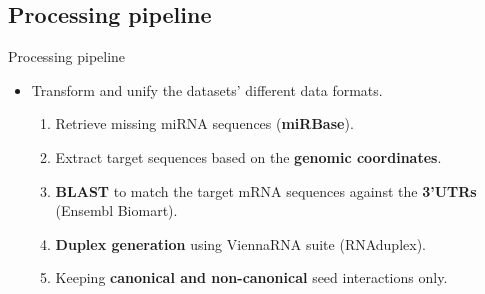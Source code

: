 \documentclass{beamer}
\begin{document}
\subsection{Processing pipeline}
\begin{frame}{Processing pipeline}
\begin{itemize}
\item Transform and unify the datasets' different data formats.
\begin{enumerate}
\item Retrieve missing miRNA sequences (\textbf{miRBase}).
\item Extract target sequences based on the \textbf{genomic coordinates}. 
\item \textbf{BLAST}  to match the target mRNA sequences against the \textbf{3'UTRs} (Ensembl Biomart).
\item \textbf{Duplex generation} using ViennaRNA suite (RNAduplex).
\item Keeping \textbf{canonical and non-canonical} seed interactions only.
\end{enumerate}
\end{itemize}



\begin{table}[h!]
\label{tab:preprocess}

\end{table}

 \end{frame}
\end{document}
